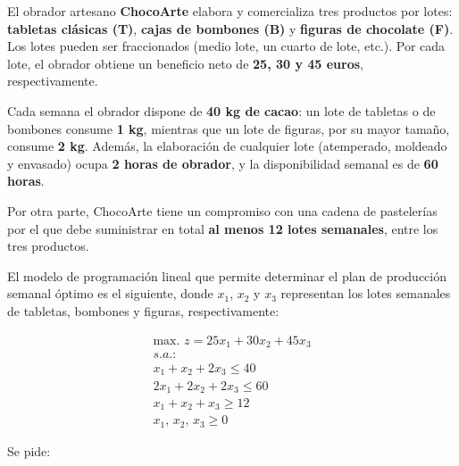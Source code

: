 El obrador artesano \textbf{ChocoArte} elabora y comercializa tres productos por lotes: \textbf{tabletas clásicas (T)}, \textbf{cajas de bombones (B)} y \textbf{figuras de chocolate (F)}. Los lotes pueden ser fraccionados (medio lote, un cuarto de lote, etc.). Por cada lote, el obrador obtiene un beneficio neto de \textbf{25, 30 y 45 euros}, respectivamente.

Cada semana el obrador dispone de \textbf{40 kg de cacao}: un lote de tabletas o de bombones consume \textbf{1 kg}, mientras que un lote de figuras, por su mayor tamaño, consume \textbf{2 kg}. Además, la elaboración de cualquier lote (atemperado, moldeado y envasado) ocupa \textbf{2 horas de obrador}, y la disponibilidad semanal es de \textbf{60 horas}.

Por otra parte, ChocoArte tiene un compromiso con una cadena de pastelerías por el que debe suministrar en total \textbf{al menos 12 lotes semanales}, entre los tres productos.

El modelo de programación lineal que permite determinar el plan de producción semanal óptimo es el siguiente, donde $x_1$, $x_2$ y $x_3$ representan los lotes semanales de tabletas, bombones y figuras, respectivamente:

\begin{equation}
\begin{split}
\mbox{max. } z = 25x_1 + 30x_2 + 45x_3\\
s.a.:\\
x_1 + x_2 + 2x_3 \leq 40\\
2x_1 + 2x_2 + 2x_3 \leq 60\\
x_1 + x_2 + x_3 \geq 12\\
x_1,\,x_2,\,x_3\geq 0
\end{split}
\end{equation}

Se pide:

